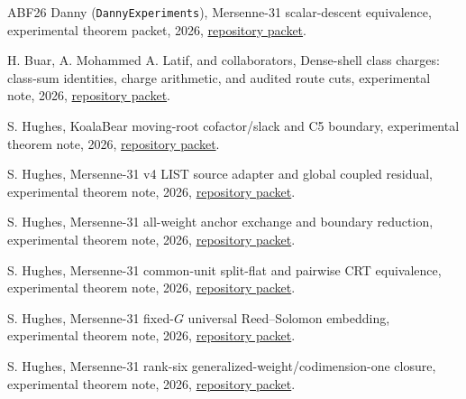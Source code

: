 \documentclass[11pt,a4paper]{amsart}
\numberwithin{equation}{section}
\theoremstyle{remark}
\begin{document}
\begin{thebibliography}{ABF26}
Danny (\texttt{DannyExperiments}),
\newblock Mersenne-31 scalar-descent equivalence,
\newblock experimental theorem packet, 2026,
\newblock \href{https://github.com/przchojecki/rs-mca/pull/993}{repository packet}.

H. Buar, A. Mohammed A. Latif, and collaborators,
\newblock Dense-shell class charges: class-sum identities, charge arithmetic, and audited route cuts,
\newblock experimental note, 2026,
\newblock \href{https://github.com/przchojecki/rs-mca/blob/5ecb9ab538a0a57dcb81018b17f32849049fb998/experimental/notes/thresholds/dense_shell_class_charges.md}{repository packet}.

S. Hughes,
\newblock KoalaBear moving-root cofactor/slack and C5 boundary,
\newblock experimental theorem note, 2026,
\newblock \href{https://github.com/przchojecki/rs-mca/blob/5ecb9ab538a0a57dcb81018b17f32849049fb998/experimental/notes/m1/m1_kb_rank9_moving_root_slack_c5_boundary_v1.md}{repository packet}.

S. Hughes,
\newblock Mersenne-31 v4 LIST source adapter and global coupled residual,
\newblock experimental theorem note, 2026,
\newblock \href{https://github.com/przchojecki/rs-mca/blob/5ecb9ab538a0a57dcb81018b17f32849049fb998/experimental/notes/thresholds/m31_list_v4_source_adapter_global_coupled_residual.md}{repository packet}.

S. Hughes,
\newblock Mersenne-31 all-weight anchor exchange and boundary reduction,
\newblock experimental theorem note, 2026,
\newblock \href{https://github.com/przchojecki/rs-mca/pull/1058}{repository packet}.

S. Hughes,
\newblock Mersenne-31 common-unit split-flat and pairwise CRT equivalence,
\newblock experimental theorem note, 2026,
\newblock \href{https://github.com/przchojecki/rs-mca/pull/1060}{repository packet}.

S. Hughes,
\newblock Mersenne-31 fixed-$G$ universal Reed--Solomon embedding,
\newblock experimental theorem note, 2026,
\newblock \href{https://github.com/przchojecki/rs-mca/pull/1061}{repository packet}.

S. Hughes,
\newblock Mersenne-31 rank-six generalized-weight/codimension-one closure,
\newblock experimental theorem note, 2026,
\newblock \href{https://github.com/przchojecki/rs-mca/blob/5ecb9ab538a0a57dcb81018b17f32849049fb998/experimental/notes/thresholds/m31_rank6_generalized_weight_codim_one_closure_v1.md}{repository packet}.


\end{thebibliography}
\end{document}
